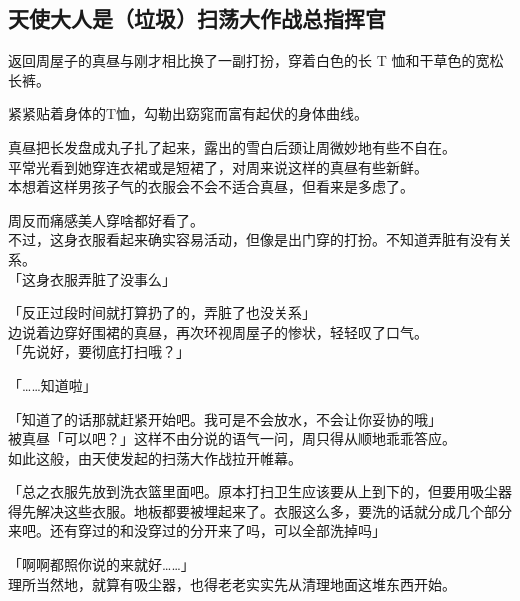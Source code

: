 \subsection{天使大人是（垃圾）扫荡大作战总指挥官}

返回周屋子的真昼与刚才相比换了一副打扮，穿着白色的长 T 恤和干草色的宽松长裤。

紧紧贴着身体的T恤，勾勒出窈窕而富有起伏的身体曲线。

真昼把长发盘成丸子扎了起来，露出的雪白后颈让周微妙地有些不自在。\\

平常光看到她穿连衣裙或是短裙了，对周来说这样的真昼有些新鲜。\\

本想着这样男孩子气的衣服会不会不适合真昼，但看来是多虑了。

周反而痛感美人穿啥都好看了。\\

不过，这身衣服看起来确实容易活动，但像是出门穿的打扮。不知道弄脏有没有关系。\\

「这身衣服弄脏了没事么」

「反正过段时间就打算扔了的，弄脏了也没关系」\\

边说着边穿好围裙的真昼，再次环视周屋子的惨状，轻轻叹了口气。\\

「先说好，要彻底打扫哦？」

「……知道啦」

「知道了的话那就赶紧开始吧。我可是不会放水，不会让你妥协的哦」\\

被真昼「可以吧？」这样不由分说的语气一问，周只得从顺地乖乖答应。\\

如此这般，由天使发起的扫荡大作战拉开帷幕。\\

\vspace{2\baselineskip}

「总之衣服先放到洗衣篮里面吧。原本打扫卫生应该要从上到下的，但要用吸尘器得先解决这些衣服。地板都要被埋起来了。衣服这么多，要洗的话就分成几个部分来吧。还有穿过的和没穿过的分开来了吗，可以全部洗掉吗」

「啊啊都照你说的来就好……」\\

理所当然地，就算有吸尘器，也得老老实实先从清理地面这堆东西开始。\\

